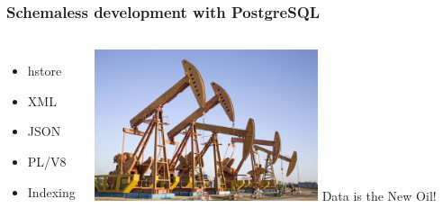 \documentclass{beamer}
\begin{document}

\begin{frame}[fragile]
  \frametitle{Schemaless development with PostgreSQL}

  \vfill

\begin{columns}[c]

  \begin{itemize}
  \item hstore
  \item XML
  \item JSON
  \item PL/V8
  \item Indexing
  \end{itemize}  

\begin{center}
  \includegraphics[height=12em]{Data-is-the-new-oil-Concentra.jpg}
  \linebreak
  Data is the New Oil!
\end{center}
\end{columns}
\end{frame}
\end{document}
